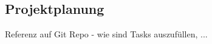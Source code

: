 \documentclass[main.tex]{subfiles} %
\begin{document}

\subsection{Projektplanung}

Referenz auf Git Repo - wie sind Tasks auszufüllen, ...
\end{document}
